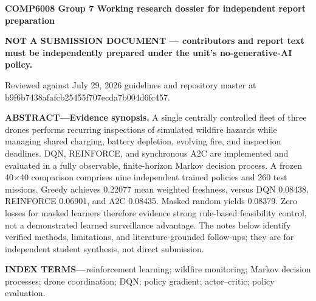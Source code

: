 \textbf{COMP6008 \textbar{} Group 7 \textbar{} Working research dossier for independent report preparation}

\textbf{NOT A SUBMISSION DOCUMENT --- contributors and report text must be independently prepared under the unit's no-generative-AI policy.}

Reviewed against July 29, 2026 guidelines and repository master at b9f6b7438afafcb25455f707ecda7b004d6fc457.

\textbf{ABSTRACT---Evidence synopsis.} A single centrally controlled fleet of three drones performs recurring inspections of simulated wildfire hazards while managing shared charging, battery depletion, evolving fire, and inspection deadlines. DQN, REINFORCE, and synchronous A2C are implemented and evaluated in a fully observable, finite-horizon Markov decision process. A frozen 40$\times$40 comparison comprises nine independent trained policies and 260 test missions. Greedy achieves 0.22077 mean weighted freshness, versus DQN 0.08438, REINFORCE 0.06901, and A2C 0.08435. Masked random yields 0.08379. Zero losses for masked learners therefore evidence strong rule-based feasibility control, not a demonstrated learned surveillance advantage. The notes below identify verified methods, limitations, and literature-grounded follow-ups; they are for independent student synthesis, not direct submission.

\textbf{INDEX TERMS---}reinforcement learning; wildfire monitoring; Markov decision processes; drone coordination; DQN; policy gradient; actor--critic; policy evaluation.
